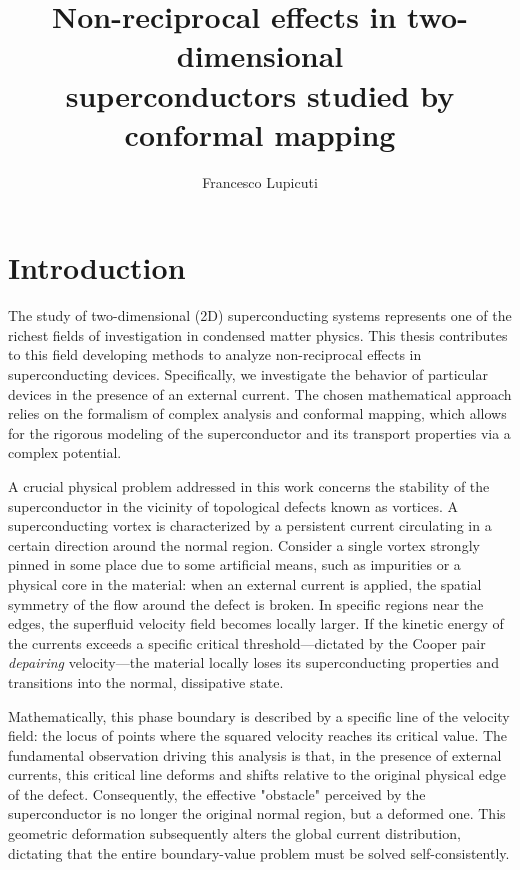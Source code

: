 \documentclass[english,binding=0.6cm,noexaminfo]{sapthesis}
\title{Non-reciprocal effects in two-dimensional \\superconductors studied by conformal mapping}
\subtitle{}
\author{Francesco Lupicuti}
\begin{document}
\frontmatter
\maketitle %
\dedication{A Cami, amica speciale. \\ Eri, sei e sarai sempre nel mio cuore.}
\tableofcontents

\mainmatter %
\chapter*{Introduction}

The study of two-dimensional (2D) superconducting systems represents one of the richest fields of investigation in condensed matter physics. This thesis contributes to this field developing methods to analyze non-reciprocal effects in superconducting devices. Specifically, we investigate the behavior of particular devices in the presence of an external current.
 The chosen mathematical approach relies on the formalism of complex analysis and conformal mapping, which allows for the rigorous modeling of the superconductor and its transport properties via a complex potential.

A crucial physical problem addressed in this work concerns the stability of the superconductor in the vicinity of topological defects known as vortices. A superconducting vortex is characterized by a persistent current circulating in a certain direction around the normal region. Consider a single vortex strongly pinned in some place due to some artificial means, such as impurities or a physical core in the material: when an external current is applied, the spatial symmetry of the flow around the defect is broken. In specific regions near the edges, the superfluid velocity field becomes locally larger. If the kinetic energy of the currents exceeds a specific critical threshold—dictated by the Cooper pair \textit{depairing} velocity—the material locally loses its superconducting properties and transitions into the normal, dissipative state.

Mathematically, this phase boundary is described by a specific line of the velocity field: the locus of points where the squared velocity reaches its critical value. The fundamental observation driving this analysis is that, in the presence of external currents, this critical line deforms and shifts relative to the original physical edge of the defect. Consequently, the effective "obstacle" perceived by the superconductor is no longer the original normal region, but a deformed one. This geometric deformation subsequently alters the global current distribution, dictating that the entire boundary-value problem must be solved self-consistently.
\end{document}
